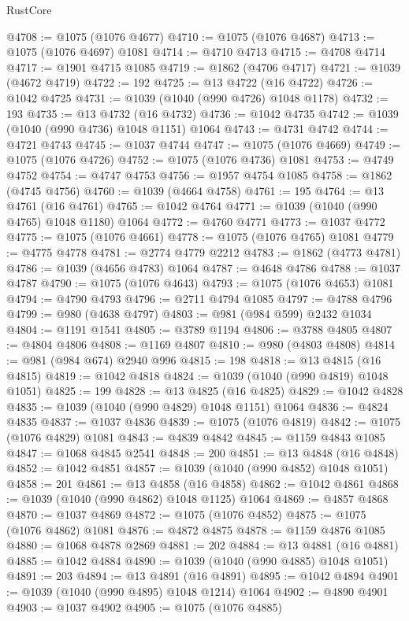 \begin{lexlean}{RustCore}
\begin{coremodule}
@4708 := @1075 (@1076 @4677)
@4710 := @1075 (@1076 @4687)
@4713 := @1075 (@1076 @4697) @1081
@4714 := @4710 @4713
@4715 := @4708 @4714
@4717 := @1901 @4715 @1085
@4719 := @1862 (@4706 @4717)
@4721 := @1039 (@4672 @4719)
@4722 := 192
@4725 := @13 @4722 (@16 @4722)
@4726 := @1042 @4725
@4731 := @1039 (@1040 (@990 @4726) @1048 @1178)
@4732 := 193
@4735 := @13 @4732 (@16 @4732)
@4736 := @1042 @4735
@4742 := @1039 (@1040 (@990 @4736) @1048 @1151) @1064
@4743 := @4731 @4742
@4744 := @4721 @4743
@4745 := @1037 @4744
@4747 := @1075 (@1076 @4669)
@4749 := @1075 (@1076 @4726)
@4752 := @1075 (@1076 @4736) @1081
@4753 := @4749 @4752
@4754 := @4747 @4753
@4756 := @1957 @4754 @1085
@4758 := @1862 (@4745 @4756)
@4760 := @1039 (@4664 @4758)
@4761 := 195
@4764 := @13 @4761 (@16 @4761)
@4765 := @1042 @4764
@4771 := @1039 (@1040 (@990 @4765) @1048 @1180) @1064
@4772 := @4760 @4771
@4773 := @1037 @4772
@4775 := @1075 (@1076 @4661)
@4778 := @1075 (@1076 @4765) @1081
@4779 := @4775 @4778
@4781 := @2774 @4779 @2212
@4783 := @1862 (@4773 @4781)
@4786 := @1039 (@4656 @4783) @1064
@4787 := @4648 @4786
@4788 := @1037 @4787
@4790 := @1075 (@1076 @4643)
@4793 := @1075 (@1076 @4653) @1081
@4794 := @4790 @4793
@4796 := @2711 @4794 @1085
@4797 := @4788 @4796
@4799 := @980 (@4638 @4797)
@4803 := @981 (@984 @599) @2432 @1034
@4804 := @1191 @1541
@4805 := @3789 @1194
@4806 := @3788 @4805
@4807 := @4804 @4806
@4808 := @1169 @4807
@4810 := @980 (@4803 @4808)
@4814 := @981 (@984 @674) @2940 @996
@4815 := 198
@4818 := @13 @4815 (@16 @4815)
@4819 := @1042 @4818
@4824 := @1039 (@1040 (@990 @4819) @1048 @1051)
@4825 := 199
@4828 := @13 @4825 (@16 @4825)
@4829 := @1042 @4828
@4835 := @1039 (@1040 (@990 @4829) @1048 @1151) @1064
@4836 := @4824 @4835
@4837 := @1037 @4836
@4839 := @1075 (@1076 @4819)
@4842 := @1075 (@1076 @4829) @1081
@4843 := @4839 @4842
@4845 := @1159 @4843 @1085
@4847 := @1068 @4845 @2541
@4848 := 200
@4851 := @13 @4848 (@16 @4848)
@4852 := @1042 @4851
@4857 := @1039 (@1040 (@990 @4852) @1048 @1051)
@4858 := 201
@4861 := @13 @4858 (@16 @4858)
@4862 := @1042 @4861
@4868 := @1039 (@1040 (@990 @4862) @1048 @1125) @1064
@4869 := @4857 @4868
@4870 := @1037 @4869
@4872 := @1075 (@1076 @4852)
@4875 := @1075 (@1076 @4862) @1081
@4876 := @4872 @4875
@4878 := @1159 @4876 @1085
@4880 := @1068 @4878 @2869
@4881 := 202
@4884 := @13 @4881 (@16 @4881)
@4885 := @1042 @4884
@4890 := @1039 (@1040 (@990 @4885) @1048 @1051)
@4891 := 203
@4894 := @13 @4891 (@16 @4891)
@4895 := @1042 @4894
@4901 := @1039 (@1040 (@990 @4895) @1048 @1214) @1064
@4902 := @4890 @4901
@4903 := @1037 @4902
@4905 := @1075 (@1076 @4885)

\end{coremodule}
\end{lexlean}
